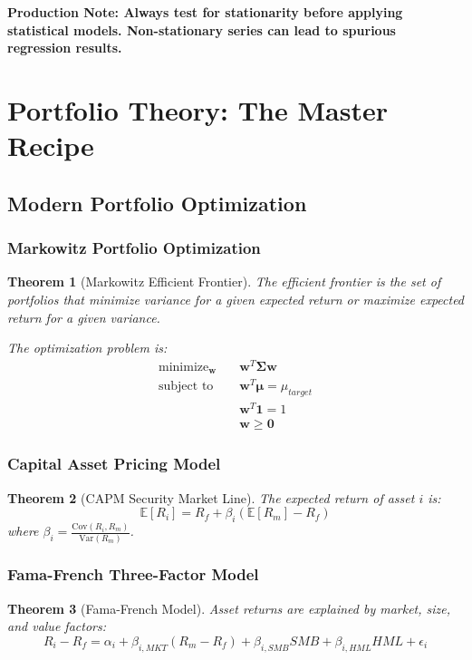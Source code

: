 \documentclass[11pt,letterpaper,openany]{book}
\newtheorem{theorem}{Theorem}[chapter]
\newcommand{\Var}{\mathrm{Var}}
\newcommand{\Cov}{\mathrm{Cov}}
\newcommand{\minimize}{\operatorname{minimize}}
\newcommand{\subjectto}{\operatorname{subject\ to}}
\begin{document}
\textbf{Production Note: Always test for stationarity before applying statistical models. Non-stationary series can lead to spurious regression results.}

\section{Portfolio Theory: The Master Recipe}

\subsection{Modern Portfolio Optimization}

\subsubsection{Markowitz Portfolio Optimization}

\begin{theorem}[Markowitz Efficient Frontier]
The efficient frontier is the set of portfolios that minimize variance for a given expected return or maximize expected return for a given variance.

The optimization problem is:
\begin{align}
\minimize_{\mathbf{w}} \quad & \mathbf{w}^T \boldsymbol{\Sigma} \mathbf{w} \\
\subjectto \quad & \mathbf{w}^T \boldsymbol{\mu} = \mu_{target} \\
& \mathbf{w}^T \mathbf{1} = 1 \\
& \mathbf{w} \geq \mathbf{0}
\end{align}
\end{theorem}

\subsubsection{Capital Asset Pricing Model}

\begin{theorem}[CAPM Security Market Line]
The expected return of asset $i$ is:
\[
\mathbb{E}[R_i] = R_f + \beta_i (\mathbb{E}[R_m] - R_f)
\]
where $\beta_i = \frac{\Cov(R_i, R_m)}{\Var(R_m)}$.
\end{theorem}

\subsubsection{Fama-French Three-Factor Model}

\begin{theorem}[Fama-French Model]
Asset returns are explained by market, size, and value factors:
\[
R_i - R_f = \alpha_i + \beta_{i,MKT} (R_m - R_f) + \beta_{i,SMB} SMB + \beta_{i,HML} HML + \epsilon_i
\]
\end{theorem}
\end{document}
